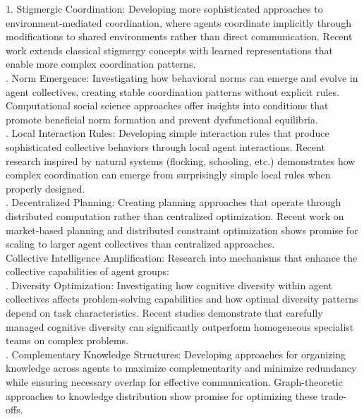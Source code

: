 1. Stigmergic Coordination: Developing more sophisticated approaches to environment-mediated coordination, where agents coordinate implicitly through modifications to shared environments rather than direct communication. Recent work extends classical stigmergy concepts with learned representations that enable more complex coordination patterns.\\ . Norm Emergence: Investigating how behavioral norms can emerge and evolve in agent collectives, creating stable coordination patterns without explicit rules. Computational social science approaches offer insights into conditions that promote beneficial norm formation and prevent dysfunctional equilibria.\\ . Local Interaction Rules: Developing simple interaction rules that produce sophisticated collective behaviors through local agent interactions. Recent research inspired by natural systems (flocking, schooling, etc.) demonstrates how complex coordination can emerge from surprisingly simple local rules when properly designed.\\ . Decentralized Planning: Creating planning approaches that operate through distributed computation rather than centralized optimization. Recent work on market-based planning and distributed constraint optimization shows promise for scaling to larger agent collectives than centralized approaches.\\ \newline
Collective Intelligence Amplification: Research into mechanisms that enhance the collective capabilities of agent groups:\\ . Diversity Optimization: Investigating how cognitive diversity within agent collectives affects problem-solving capabilities and how optimal diversity patterns depend on task characteristics. Recent studies demonstrate that carefully managed cognitive diversity can significantly outperform homogeneous specialist teams on complex problems.\\ . Complementary Knowledge Structures: Developing approaches for organizing knowledge across agents to maximize complementarity and minimize redundancy while ensuring necessary overlap for effective communication. Graph-theoretic approaches to knowledge distribution show promise for optimizing these trade-offs.\\ \newline
